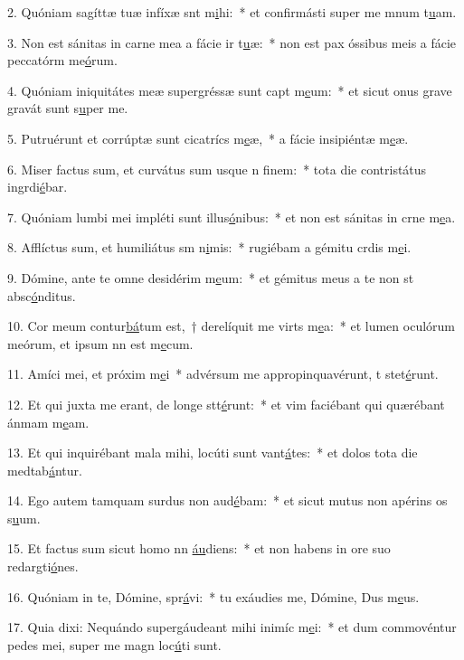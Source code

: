 2. Quóniam sagíttæ tuæ infíxæ snt m\uline{i}hi:~* et confirmásti super me mnum t\uline{u}am.\par 
3. Non est sánitas in carne mea a fácie ir t\uline{u}æ:~* non est pax óssibus meis a fácie peccatórm me\uline{ó}rum.\par 
4. Quóniam iniquitátes meæ supergréssæ sunt capt m\uline{e}um:~* et sicut onus grave gravát sunt s\uline{u}per me.\par 
5. Putruérunt et corrúptæ sunt cicatrícs m\uline{e}æ,~* a fácie insipiéntæ m\uline{e}æ.\par 
6. Miser factus sum, et curvátus sum usque n f\uline{i}nem:~* tota die contristátus ingrdi\uline{é}bar.\par 
7. Quóniam lumbi mei impléti sunt illus\uline{ó}nibus:~* et non est sánitas in crne m\uline{e}a.\par 
8. Afflíctus sum, et humiliátus sm n\uline{i}mis:~* rugiébam a gémitu crdis m\uline{e}i.\par 
9. Dómine, ante te omne desidérim m\uline{e}um:~* et gémitus meus a te non st absc\uline{ó}nditus.\par 
10. Cor meum contur\uline{bá}tum est,~† derelíquit me virts m\uline{e}a:~* et lumen oculórum meórum, et ipsum nn est m\uline{e}cum.\par 
11. Amíci mei, et próxim m\uline{e}i~* advérsum me appropinquavérunt, t stet\uline{é}runt.\par 
12. Et qui juxta me erant, de longe stt\uline{é}runt:~* et vim faciébant qui quærébant ánmam m\uline{e}am.\par 
13. Et qui inquirébant mala mihi, locúti sunt vant\uline{á}tes:~* et dolos tota die medtab\uline{á}ntur.\par 
14. Ego autem tamquam surdus non aud\uline{é}bam:~* et sicut mutus non apérins os s\uline{u}um.\par 
15. Et factus sum sicut homo nn \uline{áu}diens:~* et non habens in ore suo redargti\uline{ó}nes.\par 
16. Quóniam in te, Dómine, spr\uline{á}vi:~* tu exáudies me, Dómine, Dus m\uline{e}us.\par 
17. Quia dixi: Nequándo supergáudeant mihi inimíc m\uline{e}i:~* et dum commovéntur pedes mei, super me magn loc\uline{ú}ti sunt.\par 
